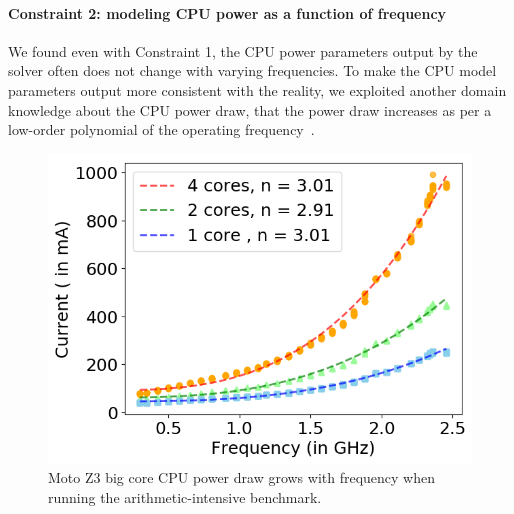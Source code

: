 \paragraph{Constraint 2: modeling CPU power as a function of frequency}
We found even with Constraint 1, the 
CPU power parameters output by the solver often does not change with varying frequencies. 
To make the CPU model parameters output more consistent with the reality, 
we exploited another domain knowledge about the CPU power draw,
that the power draw increases as per a low-order polynomial of the operating frequency~\cite{armdvfs,rizvandi2011some}.
%
\begin{figure}[tp]
    \centering
    \includegraphics[width=0.80\columnwidth]{figures/cpu_characteristics.png}
    \caption{Moto Z3 big core CPU power draw grows with frequency 
    when running the arithmetic-intensive benchmark.}
    \label{fig:cpu_characteristic}
    \vspace{-0.1in}
\end{figure}
\fi
%
